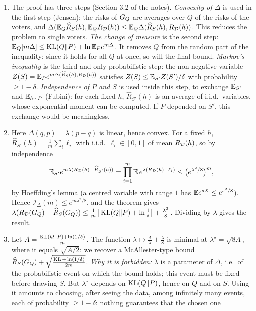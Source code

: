 \documentclass[11pt]{article}
\begin{document}
\begin{solution}
\begin{enumerate}
\item The proof has three steps (Section 3.2 of the notes).
      \emph{Convexity of $\Delta$} is used in the first step (Jensen): the risks of $G_{Q}$ are averages over $Q$ of the
      risks of the voters, and $\Delta(\mathbb{E}_Q\widehat{R}_{S}(h),\mathbb{E}_QR_{\mathcal{D}}(h))\leq\mathbb{E}_Q\Delta(\widehat{R}_{S}(h),R_{\mathcal{D}}(h))$. This reduces the problem to
      single voters.
      \emph{The change of measure} is the second step: $\mathbb{E}_Q[m\Delta]\leq\operatorname{KL}(Q\|P)+\ln\mathbb{E}_Pe^{m\Delta}$. It removes $Q$
      from the random part of the inequality; since it holds for all $Q$ at once, so will the final bound.
      \emph{Markov's inequality} is the third and only probabilistic step: the non-negative variable
      $Z(S)=\mathbb{E}_Pe^{m\Delta(\widehat{R}_{S}(h),R_{\mathcal{D}}(h))}$ satisfies $Z(S)\leq\mathbb{E}_{S'}Z(S')/\delta$ with probability $\geq1-\delta$.
      \emph{Independence of $P$ and $S$} is used inside this step, to exchange $\mathbb{E}_{S'}$ and $\mathbb{E}_{h\sim P}$ (Fubini):
      for each fixed $h$, $\widehat R_{S'}(h)$ is an average of i.i.d.\ variables, whose exponential moment can be
      computed. If $P$ depended on $S'$, this exchange would be meaningless.
\item Here $\Delta(q,p)=\lambda(p-q)$ is linear, hence convex. For a fixed $h$, $\widehat R_{S'}(h)=\frac1m\sum_i\ell_i$ with
      i.i.d.\ $\ell_i\in[0,1]$ of mean $R_{\mathcal{D}}(h)$, so by independence
      \[\mathbb{E}_{S'}e^{m\lambda(R_{\mathcal{D}}(h)-\widehat R_{S'}(h))}=\prod_{i=1}^m\mathbb{E}\,e^{\lambda(R_{\mathcal{D}}(h)-\ell_i)}\leq\big(e^{\lambda^2/8}\big)^m,\]
      by Hoeffding's lemma (a centred variable with range $1$ has $\mathbb{E} e^{sX}\leq e^{s^2/8}$). Hence
      $\mathcal I_\Delta(m)\leq e^{m\lambda^2/8}$, and the theorem gives
      $\lambda(R_{\mathcal{D}}(G_{Q})-\widehat{R}_{S}(G_{Q}))\leq\frac1m\big[\operatorname{KL}(Q\|P)+\ln\frac1\delta\big]+\frac{\lambda^2}8$. Dividing by $\lambda$ gives the result.
\item Let $A=\frac{\operatorname{KL}(Q\|P)+\ln(1/\delta)}{m}$. The function $\lambda\mapsto\frac A\lambda+\frac\lambda8$ is minimal at
      $\lambda^\star=\sqrt{8A}$, where it equals $\sqrt{A/2}$: we recover a McAllester-type bound
      $\widehat{R}_{S}(G_{Q})+\sqrt{\frac{\operatorname{KL}+\ln(1/\delta)}{2m}}$. \emph{Why it is forbidden:} $\lambda$ is a parameter of $\Delta$, i.e.\ of
      the probabilistic event on which the bound holds; this event must be fixed before drawing $S$. But
      $\lambda^\star$ depends on $\operatorname{KL}(Q\|P)$, hence on $Q$ and on $S$. Using it amounts to choosing, after seeing the
      data, among infinitely many events, each of probability $\geq1-\delta$: nothing guarantees that the chosen one

\end{enumerate}
\end{solution}
\end{document}

